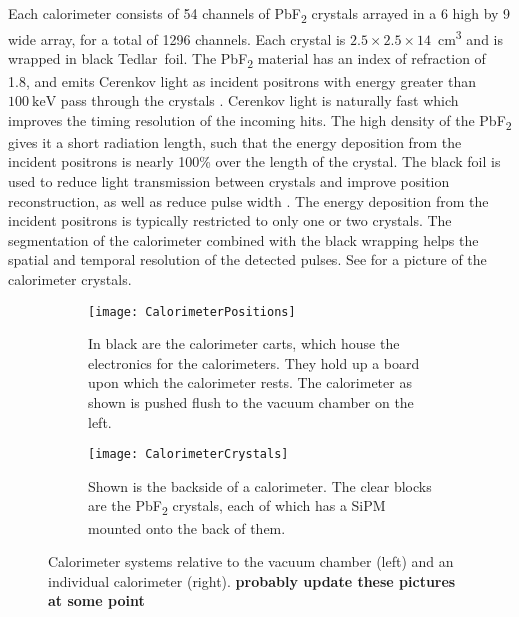 Each calorimeter consists of 54 channels of PbF\textsubscript{2} crystals arrayed in a 6 high by 9 wide array, for a total of 1296 channels. Each crystal is $2.5 \times 2.5 \times 14$~cm\textsuperscript{3} and is wrapped in black Tedlar\textregistered\ foil. The PbF\textsubscript{2} material has an index of refraction of 1.8, and emits Cerenkov light as incident positrons with energy greater than $\SI{100}{\keV}$ pass through the crystals \cite{Fienberg:2014kka}. Cerenkov light is naturally fast which improves the timing resolution of the incoming hits. The high density of the PbF\textsubscript{2} gives it a short radiation length, such that the energy deposition from the incident positrons is nearly 100\% over the length of the crystal. The black foil is used to reduce light transmission between crystals and improve position reconstruction, as well as reduce pulse width \cite{Kaspar:2016ofv}. The energy deposition from the incident positrons is typically restricted to only one or two crystals. The segmentation of the calorimeter combined with the black wrapping helps the spatial and temporal resolution of the detected pulses. See  for a picture of the calorimeter crystals.


\begin{figure}[]
\centering
    \begin{subfigure}[t]{0.45\textwidth}
        \centering
        \texttt{[image: CalorimeterPositions]}
        \caption{In black are the calorimeter carts, which house the electronics for the calorimeters. They hold up a board upon which the calorimeter rests. The calorimeter as shown is pushed flush to the vacuum chamber on the left.}
    \label{fig:CalorimeterPositions}
    \end{subfigure}%
    \hspace{1cm}
    \begin{subfigure}[t]{0.45\textwidth}
        \centering
        \texttt{[image: CalorimeterCrystals]}
        \caption{Shown is the backside of a calorimeter. The clear blocks are the PbF\textsubscript{2} crystals, each of which has a SiPM mounted onto the back of them.}
    \label{fig:CalorimeterCrystals}
    \end{subfigure}
\caption[Calorimeters]{Calorimeter systems relative to the vacuum chamber (left) and an individual calorimeter (right). \bf{probably update these pictures at some point}}
\label{fig:calos}
\end{figure}




